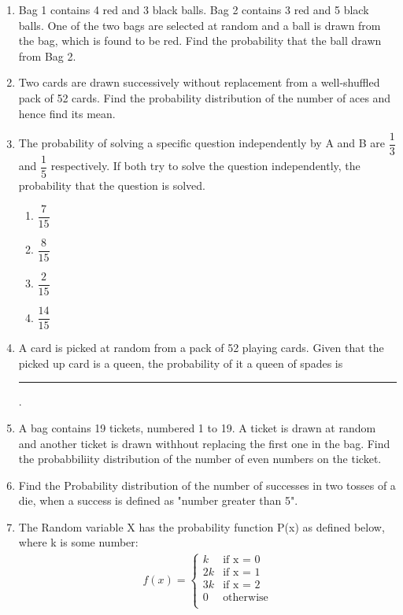 \documentclass[a4paper,12pt]{article}
\begin{document}
\begin{enumerate}
\item Bag 1 contains 4 red and 3 black balls. Bag 2 contains 3 red and 5 black balls. One of the two bags are  selected at random and a ball is drawn from the bag, which is found to be red. Find the probability that the ball drawn from Bag 2.

\item
Two cards are drawn successively without replacement from a well-shuffled pack of 52 cards. Find the probability distribution of the number of aces and hence find its mean.

\item The probability of solving a specific question independently by A and B are $\dfrac{1}{3}$ and $\dfrac{1}{5}$ respectively. If both try to solve the question independently, the probability that the question is solved. 
\begin{enumerate}
\item $\dfrac{7}{15}$
\item $\dfrac{8}{15}$
\item $\dfrac{2}{15}$
\item $\dfrac{14}{15}$
\end{enumerate}

\item A card is picked at random from a pack of 52 playing cards. Given that the picked up card is a queen, the probability of it a queen of spades is \rule{2cm}{0.15mm}.

\item A bag contains 19 tickets, numbered 1 to 19. A ticket is drawn at random and another ticket is drawn withhout replacing the first one in the bag. Find the probabbiliity distribution of the number of even numbers on the ticket.
\item
Find the Probability distribution of the number of successes in two tosses of a die, when a success is defined as "number greater than 5".

\item The Random variable X has the probability function P(x) as defined below, where k is some number:\\
\begin{align}
f(x) = 
\begin{cases}
	k & \text{if  x = 0} \\
	2k & \text{if x = 1}\\
	3k & \text{if x = 2}\\
	0 & \text{otherwise}\\
\end{cases}
\end{align}


\end{enumerate}
\end{document}
